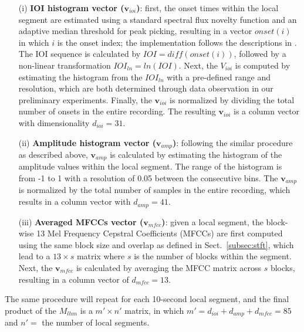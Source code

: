 \documentclass{article}
\begin{document}
\begin{itemize}
\item[(i)] \textbf{IOI histogram vector ($\mathbf{v}_{ioi}$)}: first, the onset times within the local segment are estimated using a standard spectral flux novelty function and an adaptive median threshold for peak picking, resulting in a vector $onset(i)$ in which $i$ is the onset index; the implementation follows the descriptions in \cite{Lerch2012}. The IOI sequence is calculated by $IOI = diff(onset(i))$, followed by a non-linear transformation $IOI_{ln} = ln(IOI)$. Next, the $V_{ioi}$ is computed by estimating the histogram from the $IOI_{ln}$ with a pre-defined range and resolution, which are both determined through data observation in our preliminary experiments. Finally, the $\mathbf{v}_{ioi}$ is normalized by dividing the total number of onsets in the entire recording. The resulting $\mathbf{v}_{ioi}$ is a column vector with dimensionality $d_{ioi} = 31$.

\item[(ii)] \textbf{Amplitude histogram vector ($\mathbf{v}_{amp}$)}: following the similar procedure as described above, $\mathbf{v}_{amp}$ is calculated by estimating the histogram of the amplitude values within the local segment. The range of the histogram is from -1 to 1 with a resolution of 0.05 between the consecutive bins. The $\mathbf{v}_{amp}$ is normalized by the total number of samples in the entire recording, which results in a column vector with $d_{amp} = 41$.  

\item[(iii)] \textbf{Averaged MFCCs vector ($\mathbf{v}_{mfcc}$)}: given a local segment, the block-wise 13 Mel Frequency Cepstral Coefficients (MFCCs) are first computed using the same block size and overlap as defined in Sect.~\ref{subsec:stft}, which lead to a $13 \times s$ matrix where $s$ is the number of blocks within the segment. Next, the $\mathbf{v}_{mfcc}$ is calculated by averaging the MFCC matrix across $s$ blocks, resulting in a column vector of $d_{mfcc} = 13$. 
\end{itemize} 

The same procedure will repeat for each 10-second local segment, and the final product of the $M_{lhm}$ is a $m' \times n'$ matrix,  in which $m' = d_{ioi} + d_{amp} + d_{mfcc} = 85$ and $n' = $ the number of local segments.
\end{document}
